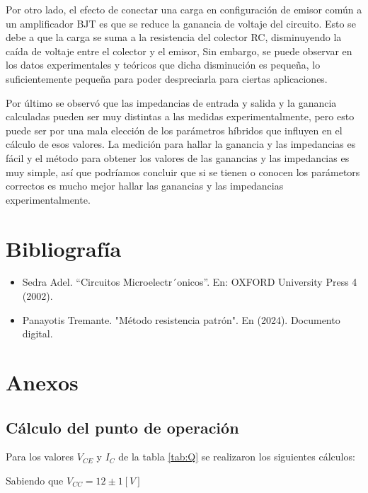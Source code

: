 \documentclass[12pt, a4paper]{article}
\begin{document}
    Por otro lado, el efecto de conectar una carga en configuración de emisor común a un amplificador BJT es que se reduce la ganancia de voltaje del circuito. Esto se debe a que la carga se suma a la resistencia del colector RC, disminuyendo la caída de voltaje entre el colector y el emisor, Sin embargo, se puede observar en los datos experimentales y teóricos que dicha disminución es pequeña, lo suficientemente pequeña para poder despreciarla para ciertas aplicaciones.
    
    Por último se observó que las impedancias de entrada y salida y la ganancia calculadas pueden ser muy distintas a las medidas experimentalmente, pero esto puede ser por una mala elección de los parámetros híbridos que influyen en el cálculo de esos valores. La medición para hallar la ganancia y las impedancias es fácil y el método para obtener los valores de las ganancias y las impedancias es muy simple, así que podríamos concluir que si se tienen o conocen los parámetors correctos es mucho mejor hallar las ganancias y las impedancias experimentalmente.

    \newpage

    \section{Bibliografía}

    \begin{itemize}
        \item Sedra Adel. “Circuitos Microelectr´onicos”. En: OXFORD University Press 4 (2002).
        \item Panayotis Tremante. "Método resistencia patrón". En (2024). Documento digital.
    \end{itemize}
    
    \printbibliography

    \newpage

    \section{Anexos}

    \subsection{Cálculo del punto de operación}

    Para los valores $V_{CE}$ y $I_C$ de la tabla \ref{tab:Q} se realizaron los siguientes cálculos:

    Sabiendo que $V_{CC} = 12 \pm 1 [V]$
\end{document}
